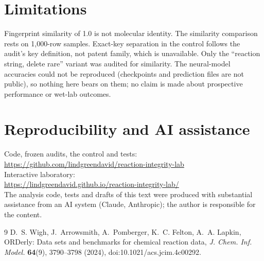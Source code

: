 \documentclass[11pt]{article}
\begin{document}
\section{Limitations}
Fingerprint similarity of 1.0 is not molecular identity. The similarity comparison rests on 1{,}000-row samples. Exact-key separation
in the control follows the audit's key definition, not patent family, which is unavailable. Only the ``reaction string, delete
rare'' variant was audited for similarity. The neural-model accuracies could not be reproduced (checkpoints and prediction files are
not public), so nothing here bears on them; no claim is made about prospective performance or wet-lab outcomes.

\section*{Reproducibility and AI assistance}
Code, frozen audits, the control and tests:\\
\url{https://github.com/lindgreendavid/reaction-integrity-lab}\\
Interactive laboratory:\\
\url{https://lindgreendavid.github.io/reaction-integrity-lab/}\\
The analysis code, tests and drafts of this text were produced with substantial assistance from an AI system (Claude, Anthropic);
the author is responsible for the content.

\begin{thebibliography}{9}
 D.~S. Wigh, J.~Arrowsmith, A.~Pomberger, K.~C. Felton, A.~A. Lapkin, ORDerly: Data sets and benchmarks for
chemical reaction data, \emph{J. Chem. Inf. Model.} \textbf{64}(9), 3790--3798 (2024), doi:10.1021/acs.jcim.4c00292.
\end{thebibliography}
\end{document}
